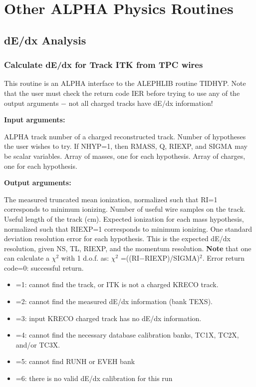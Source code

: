 \chapter{\label{sec-OARD}Other ALPHA Physics Routines}
\par
\section{\label{sec-OARDEDX}dE/dx Analysis}
 
\par
\subsection{\label{sec-ARDEDX1}Calculate dE/dx for Track ITK from TPC wires}
\par
{}
\par
This routine is an ALPHA interface to the ALEPHLIB routine TIDHYP.
Note that the user must check the return code IER before trying
to use any of the output arguments $-$ not all charged tracks have
dE/dx information!
\par
{\bf Input arguments:}
\begin{indentlist}{ 3.50cm}{ 3.75cm}
ALPHA track number of a charged reconstructed track.
Number of hypotheses the user wishes to try.
If NHYP=1, then RMASS, Q, RIEXP, and SIGMA may be scalar variables.
Array of masses, one for each hypothesis.
Array of charges, one for each hypothesis.
\end{indentlist}
\par
{\bf Output arguments:}
\begin{indentlist}{ 3.50cm}{ 3.75cm}
The measured truncated mean ionization, normalized
such that
RI=1 corresponds to minimum ionizing.
Number of useful wire samples on the track.
Useful length of the track (cm).
Expected ionization for each mass hypothesis,
normalized such that RIEXP=1 corresponds to minimum ionizing.
One standard deviation resolution error for
each
hypothesis.  This is the expected dE/dx
resolution, given NS, TL, RIEXP, and
the momentum resolution.
{\bf Note} that one can calculate a $\chi^2$ with 1 d.o.f. as:
$\chi^2$ =((RI$-$RIEXP)/SIGMA)$^2$.
Error return code=0: successful return.
\begin{itemize}
\item =1:  cannot find the track, or ITK is not a charged KRECO track.
\item =2:  cannot find the measured dE/dx information (bank TEXS).
\item =3:  input KRECO charged track has no dE/dx information.
\item =4:  cannot find the necessary database calibration banks,
TC1X, TC2X, and/or TC3X.
\item =5:  cannot find RUNH or EVEH bank
\item =6:  there is no valid dE/dx calibration for this run
\end{itemize}
\end{indentlist}
 
